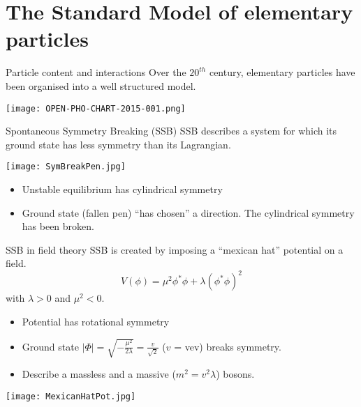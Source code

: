 \section{The Standard Model of elementary particles}
\begin{frame}{Particle content and interactions}
    Over the $20^{th}$ century, elementary particles have been organised into a well structured model.

  \begin{center} \texttt{[image: OPEN-PHO-CHART-2015-001.png]} \end{center}
\end{frame}
\begin{frame}{Spontaneous Symmetry Breaking (SSB)}
  SSB describes a system for which its ground state has less symmetry than its Lagrangian.

  \texttt{[image: SymBreakPen.jpg]}
  \begin{itemize}
  \item Unstable equilibrium has cylindrical symmetry
  \item Ground state (fallen pen) ``has chosen'' a direction.
    The cylindrical symmetry has been broken.
  \end{itemize}
\end{frame}
\begin{frame}{SSB in field theory}
  SSB is created by imposing a ``mexican hat'' potential on a field.
  \begin{equation}
    \label{eq:orgdea495d}
    V(\phi) = \mu^2\phi^*\phi+\lambda(\phi^*\phi)^2
  \end{equation}
  with  $\lambda>0$ and $\mu^2 <0$.
  
  \begin{minipage}{0.49\linewidth}
  \begin{itemize}
  \item Potential has rotational symmetry
  \item Ground state $|\Phi|=\sqrt{-\frac{\mu^2}{2\lambda}}= \frac{v}{\sqrt{2}}$ ($v$ = vev) breaks symmetry.
  \item Describe a massless and a massive ($m^2=v^2\lambda$) bosons.
  \end{itemize}
  \end{minipage}
  \hfill
  \begin{minipage}{0.49\linewidth}
    \texttt{[image: MexicanHatPot.jpg]}
  \end{minipage}
\end{frame}
